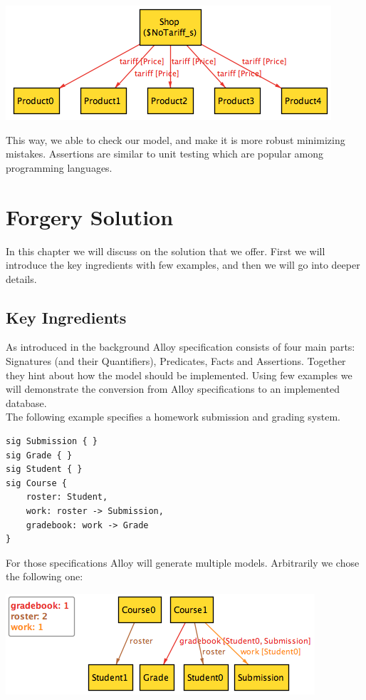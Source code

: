 \documentclass[oneside]{book}
\begin{document}
\begin{center}
\includegraphics[scale=0.6]{counterexample1}
\end{center}

This way, we able to check our model, and make it is more robust minimizing mistakes. Assertions are similar to unit testing which are popular among programming languages.

\newpage

\chapter{Forgery Solution}
In this chapter we will discuss on the solution that we offer. First we will introduce the key ingredients with few examples, and then we will go into deeper details.

\section{Key Ingredients}

As introduced in the background Alloy specification consists of four main parts: Signatures (and their Quantifiers), Predicates, Facts and Assertions. Together they hint about how the model should be implemented. Using few examples we will demonstrate the conversion from Alloy specifications to an implemented database.\\

The following example specifies a homework submission and grading system. 

\begin{lstlisting}
sig Submission { } 
sig Grade { }
sig Student { }
sig Course {
	roster: Student,
	work: roster -> Submission,
	gradebook: work -> Grade
}
\end{lstlisting}

For those specifications Alloy will generate multiple models. Arbitrarily we chose the following one:\\

\begin{center}
\includegraphics[scale=0.6]{overview1}
\end{center}
\end{document}
